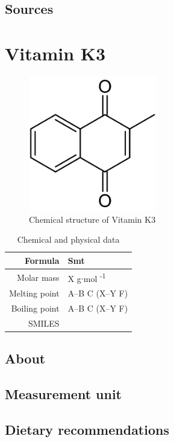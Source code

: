 \documentclass{book}
\begin{document}
\section{Sources}


\chapter{Vitamin K3}
\begin{figure}[h]
	\caption{Chemical structure of Vitamin K3}
	\centering \includegraphics[width=0.5\textwidth]{images/Vitamin_K3_chemical_structure}
\end{figure}

\begin{table}[h]
	\caption{Chemical and physical data}
	\centering \begin{tabular}{| r | l |}
		\hline
		Formula & Smt\\ \hline
		Molar mass & X g$\cdot$mol \textsuperscript{-1}\\ \hline
		Melting point & A--B \degree C (X--Y \degree F)\\ \hline
		Boiling point & A--B \degree C (X--Y \degree F)\\ \hline
		SMILES & \\ \hline
	\end{tabular}
\end{table}
\newpage

\section{About}


\section{Measurement unit}


\section{Dietary recommendations}
\end{document}
